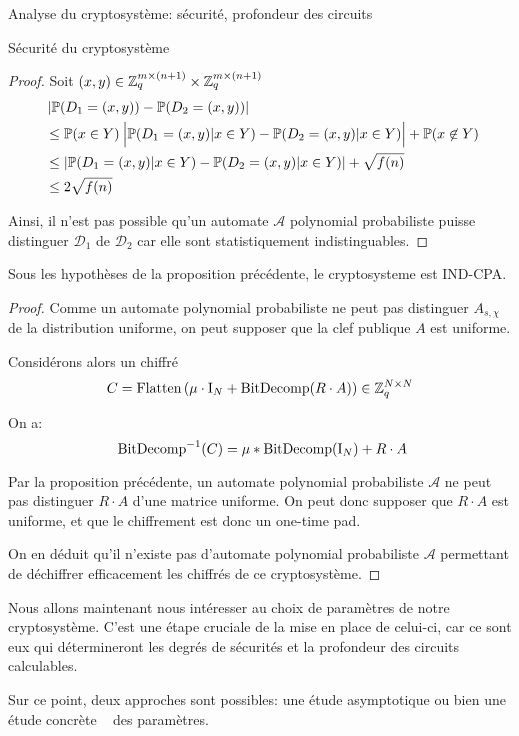 \begin{section}{Analyse du cryptosystème: sécurité, profondeur des circuits}
\begin{subsection}{Sécurité du cryptosystème}
\begin{proof}
	
	Soit $(x,y)\in \mathbb{Z}_q^{m \times (n+1)} \times \mathbb{Z}_q^{m \times (n+1)}$
	\begin{align*}
	&\left|\PP(D_1 = (x,y)) - \PP(D_2 = (x,y))\right| \\ &\leq \PP(x\in Y)\:
	\Big|\PP(D_1 
	= (x,y)| x\in Y) - \PP(D_2 = (x,y)|x\in Y)\Big| + \PP(x \not\in Y)  \\
	&\leq |\PP(D_1 = (x,y) | x \in Y) - \PP(D_2 = (x,y)|x \in Y)| + \sqrt{f(n)} \\
	&\leq 2\sqrt{f(n)} 
	\end{align*}
	
	Ainsi, il n'est pas possible qu'un automate $\mathcal{A}$
	polynomial probabiliste puisse distinguer 
	$\mathcal{D}_1$ de $\mathcal{D}_2$ car elle sont statistiquement 
	indistinguables.
	\end{proof}
	\begin{thm}
	\label{ind_cpa}
	Sous les hypothèses de la proposition précédente, le
	cryptosysteme est IND-CPA.
	\end{thm}
	\begin{proof}
	Comme un automate polynomial probabiliste ne peut pas distinguer
	$A_{s, \chi}$ de la distribution uniforme, on peut supposer que la
	clef publique $A$ est uniforme.

	Considérons alors un chiffré 
	\[C = \text{Flatten}\left(\mu \cdot \text{I}_N + \text{BitDecomp}(R\cdot A)\right) \in
	\mathbb{Z}_q^{N\times N}\]

	On a:
	\[ \bitdecomp^{-1}(C) = \mu * \bitdecomp(\id_N) + R\cdot A\]

	Par la proposition précédente, un automate polynomial probabiliste $\mathcal{A}$
	ne peut pas distinguer $R\cdot A$ d'une matrice uniforme. On peut donc
	supposer que $R\cdot A$ est uniforme, et que le chiffrement est donc
	un one-time pad.

	On en déduit qu'il n'existe pas d'automate polynomial probabiliste
	$\mathcal{A}$ permettant de déchiffrer efficacement les chiffrés de ce cryptosystème.
	\end{proof}
	
	\end{subsection}

	Nous allons maintenant nous intéresser au choix de paramètres de notre
	cryptosystème. C'est une étape cruciale de la mise en place de celui-ci,
	car ce sont eux qui détermineront les degrés de sécurités et la profondeur des circuits calculables.
	
	Sur ce point, deux approches sont possibles: une étude asymptotique ou
	bien une étude \og concrète \fg~ des paramètres.


\end{section}
